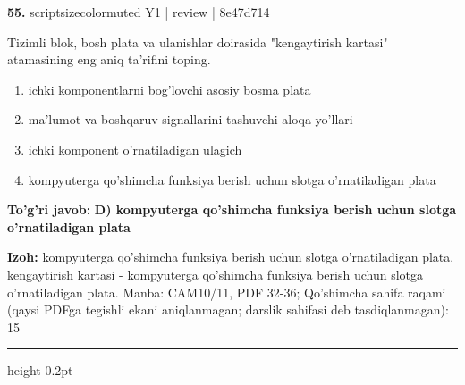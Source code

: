 \documentclass[10pt,a4paper]{article}
\begin{document}
{\bfseries\sffamily\color{ink} 55.} {scriptsizecolor{muted} Y1 | review | 8e47d714}
\par
Tizimli blok, bosh plata va ulanishlar doirasida "kengaytirish kartasi" atamasining eng aniq ta'rifini toping.
\begin{enumerate}[label=\Alph*),leftmargin=9mm]
\item ichki komponentlarni bog'lovchi asosiy bosma plata
\item ma'lumot va boshqaruv signallarini tashuvchi aloqa yo'llari
\item ichki komponent o'rnatiladigan ulagich
\item kompyuterga qo'shimcha funksiya berish uchun slotga o'rnatiladigan plata
\end{enumerate}
\begin{tcolorbox}[enhanced,breakable,colback=teal!4,colframe=teal!60!black,boxrule=0.45pt,arc=1.2mm,left=2.7mm,right=2.7mm,top=1.8mm,bottom=1.8mm,before skip=2mm,after skip=2mm]
{\bfseries\sffamily\color{teal}To'g'ri javob:} \textbf{D) kompyuterga qo'shimcha funksiya berish uchun slotga o'rnatiladigan plata}
\par\smallskip
{\bfseries Izoh:} kompyuterga qo'shimcha funksiya berish uchun slotga o'rnatiladigan plata. kengaytirish kartasi - kompyuterga qo'shimcha funksiya berish uchun slotga o'rnatiladigan plata. Manba: CAM10/11, PDF 32-36; Qo'shimcha sahifa raqami (qaysi PDFga tegishli ekani aniqlanmagan; darslik sahifasi deb tasdiqlanmagan): 15
\end{tcolorbox}
\vspace{2mm}\hrule height 0.2pt\vspace{3mm}
\end{document}
